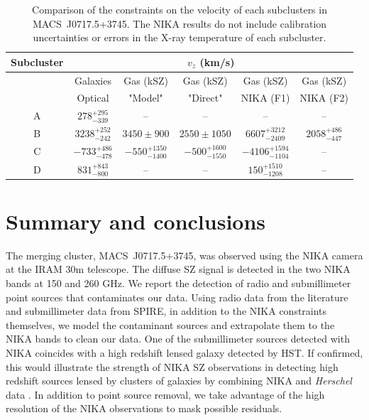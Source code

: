 \documentclass[twocolumn,traditabstract]{aa}
\begin{document}
\begin{table}[h]
\caption{{\footnotesize Comparison of the constraints on the velocity of each subclusters in \mbox{MACS~J0717.5+3745}. The NIKA results do not include calibration uncertainties or errors in the X-ray temperature of each subcluster.}}
\begin{center}
\begin{tabular}{c|c|c|c|c|c}
\hline
\hline
Subcluster & \multicolumn{5}{c}{$v_z$ (km/s)} \\
\hline
 & Galaxies & Gas (kSZ) & Gas (kSZ) & Gas (kSZ) & Gas (kSZ) \\
 & Optical \citep{Ma2009} & "Model" \citep{Sayers2013} & "Direct" \citep{Sayers2013} & NIKA (F1) & NIKA (F2) \\
\hline
A & $278^{+295}_{-339}$ & -- & -- & -- & -- \\
B & $3238^{+252}_{-242}$ & $3450 \pm 900$ & $2550 \pm 1050$ & $6607_{-2409}^{+3212}$ & $2058_{-447}^{+486}$ \\
C & $-733^{+486}_{-478}$ & $-550^{+1350}_{-1400}$ & $-500^{+1600}_{-1550}$ & $-4106_{-1104}^{+1594}$ & -- \\
D & $831^{+843}_{-800}$ & -- & -- & $150_{-1208}^{+1510}$ & -- \\
\hline
\end{tabular}
\end{center}
\label{tab:comparison_velocity_measurements}
\end{table}

\section{Summary and conclusions}\label{sec:conclusions} 
The merging cluster, \mbox{MACS~J0717.5+3745}, was observed using the NIKA camera at the IRAM 30m telescope. The diffuse SZ signal is detected in the two NIKA bands at 150 and 260 GHz. We report the detection of radio and submillimeter point sources that contaminates our data. Using radio data from the literature and submillimeter data from SPIRE, in addition to the NIKA constraints themselves, we model the contaminant sources and extrapolate them to the NIKA bands to clean our data. One of the submillimeter sources detected with NIKA coincides with a high redshift lensed galaxy detected by HST. If confirmed, this would illustrate the strength of NIKA SZ observations in detecting high redshift sources lensed by clusters of galaxies by combining NIKA and \textit{Herschel} data \citep[see also][]{Adam2015,Adam2016}. In addition to point source removal, we take advantage of the high resolution of the NIKA observations to mask possible residuals.
\end{document}
